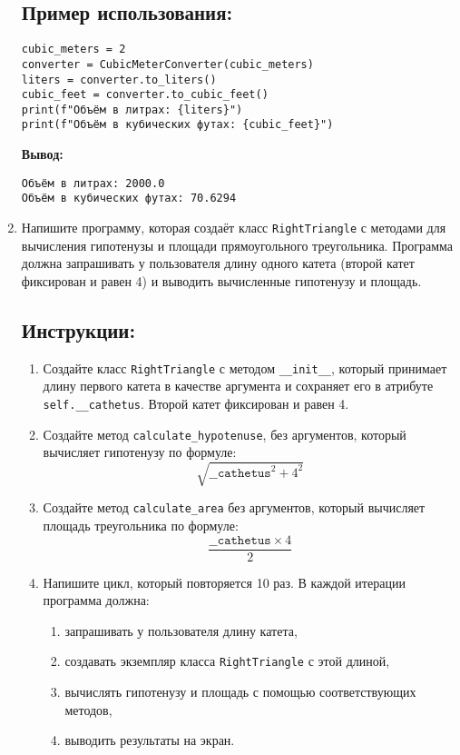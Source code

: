 \begin{enumerate}
\subsection*{Пример использования:}
\begin{verbatim}
cubic_meters = 2
converter = CubicMeterConverter(cubic_meters)
liters = converter.to_liters()
cubic_feet = converter.to_cubic_feet()
print(f"Объём в литрах: {liters}")
print(f"Объём в кубических футах: {cubic_feet}")
\end{verbatim}

\textbf{Вывод:}
\begin{verbatim}
Объём в литрах: 2000.0
Объём в кубических футах: 70.6294
\end{verbatim}

\item
Напишите программу, которая создаёт класс \texttt{RightTriangle} с методами для вычисления гипотенузы
и площади прямоугольного треугольника. Программа должна запрашивать у пользователя длину одного катета
(второй катет фиксирован и равен 4) и выводить вычисленные гипотенузу и площадь.

\subsection*{Инструкции:}
\begin{enumerate}
\item Создайте класс \texttt{RightTriangle} с методом
\texttt{\_\_init\_\_}, который принимает длину первого катета в
качестве аргумента и сохраняет его в атрибуте \texttt{self.\_\_cathetus}.
Второй катет фиксирован и равен 4.

\item Создайте метод \texttt{calculate\_hypotenuse},
без аргументов, который вычисляет гипотенузу по формуле:
\[
\sqrt{\texttt{\_\_cathetus}^2 + 4^2}
\]

\item Создайте метод \texttt{calculate\_area} без аргументов,
который вычисляет площадь треугольника по формуле:
\[
\frac{\texttt{\_\_cathetus} \times 4}{2}
\]

\item Напишите цикл, который повторяется 10 раз. В каждой итерации программа должна:
\begin{enumerate}
\item запрашивать у пользователя длину катета,
\item создавать экземпляр класса \texttt{RightTriangle} с этой длиной,
\item вычислять гипотенузу и площадь с помощью соответствующих методов,
\item выводить результаты на экран.
\end{enumerate}
\end{enumerate}


\end{enumerate}
